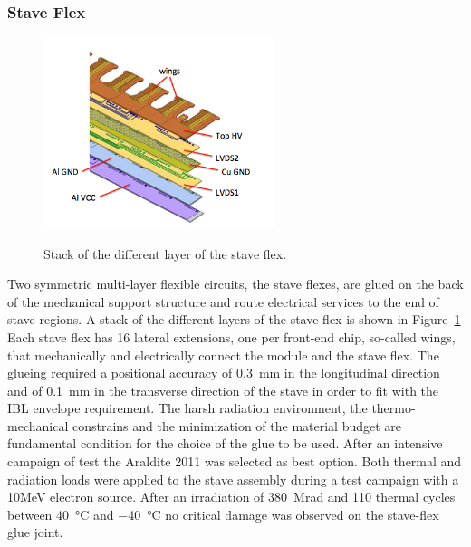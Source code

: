 \subsubsection{Stave Flex}
\begin{figure}
{\includegraphics[width=0.6\textwidth]{Images/IBL_paper/chapter05_Staves/FlexStack3D.png}}
\caption{Stack of the different layer of the stave flex. }
\label{fig:Flex3D}
\end{figure}
Two symmetric multi-layer flexible circuits, the stave flexes, are glued on the back of the mechanical support structure and route electrical services to the end of stave regions. A stack of the different layers of the stave flex is shown in Figure~\ref{fig:Flex3D}
Each stave flex has 16 lateral extensions, one per front-end chip, so-called wings, that mechanically and electrically connect the module and the stave flex. 
The glueing required a positional accuracy of \SI{0.3}{\milli\meter} in the longitudinal direction and of \SI{0.1}{\milli\meter} in the transverse direction of the stave in order to fit with the IBL envelope requirement.
The harsh radiation environment, the thermo-mechanical constrains and the minimization of the material budget are fundamental condition for the choice of the glue to be used. After an intensive campaign of test the Araldite 2011 was selected as best option.
Both thermal and radiation loads were applied to the stave assembly during a test campaign with a 10MeV electron source. After an irradiation of \SI{380}{\mega\radian} and 110 thermal cycles between \SI{40}{\celsius} and \SI{-40}{\celsius} no critical damage was observed on the stave-flex glue joint\cite{BilbaodeMendizabal:1557832}.

\clearpage


